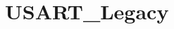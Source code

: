 \hypertarget{group___u_s_a_r_t___legacy}{\section{U\-S\-A\-R\-T\-\_\-\-Legacy}
\label{group___u_s_a_r_t___legacy}
}
